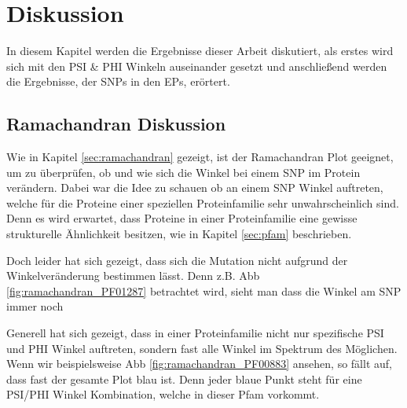 \chapter{Diskussion}

In diesem Kapitel werden die Ergebnisse dieser Arbeit diskutiert, als erstes wird sich mit den PSI \& PHI Winkeln auseinander gesetzt und anschließend werden die Ergebnisse, der \ac{SNP}s in den \ac{EP}s, erörtert.


\section{Ramachandran Diskussion}

Wie in Kapitel \ref{sec:ramachandran} gezeigt, ist der Ramachandran Plot geeignet, um zu überprüfen, ob und wie sich die Winkel bei einem \ac{SNP} im Protein verändern. Dabei war die Idee zu schauen ob an einem \ac{SNP} Winkel auftreten, welche für die Proteine einer speziellen Proteinfamilie sehr unwahrscheinlich sind. Denn es wird erwartet, dass Proteine in einer Proteinfamilie eine gewisse strukturelle Ähnlichkeit besitzen, wie in Kapitel \ref{sec:pfam} beschrieben. 

Doch leider hat sich gezeigt, dass sich die Mutation nicht aufgrund der Winkelveränderung bestimmen lässt. Denn z.B. \ac{Abb} \ref{fig:ramachandran_PF01287} betrachtet wird, sieht man dass die Winkel am \ac{SNP} immer noch

Generell hat sich gezeigt, dass in einer Proteinfamilie nicht nur spezifische PSI und PHI Winkel auftreten, sondern fast alle Winkel im Spektrum des Möglichen. Wenn wir beispielsweise \ac{Abb} \ref{fig:ramachandran_PF00883} ansehen, so fällt auf, dass fast der gesamte Plot blau ist. Denn jeder blaue Punkt steht für eine PSI/PHI Winkel Kombination, welche in dieser \ac{Pfam} vorkommt. 

